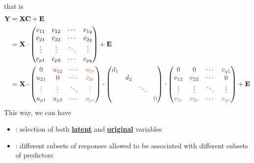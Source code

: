 \documentclass[twoside]{article}
\begin{document}
that is 
\begin{align*}
    \mathbf{Y} &= \mathbf{X}\mathbf{C} +\mathbf{E}\\
    &= \mathbf{X}\cdot \begin{pmatrix}
        c_{11} & c_{12} & \cdots & c_{1q} \\
        c_{21} & c_{22} & \cdots & c_{2q} \\
        \vdots & \vdots & \ddots & \vdots \\
        c_{p1} & c_{p2} & \cdots & c_{pq} 
    \end{pmatrix} + \mathbf{E} \\
    &= \mathbf{X}\cdot \begin{pmatrix}
        \textcolor{myblue}{0} & \textcolor{myred}{u_{12}} & \cdots & \textcolor{myorange}{u_{1r}} \\
        \textcolor{myblue}{u_{21}} & \textcolor{myred}{0} & \cdots & \textcolor{myorange}{c_{2r}} \\
        \textcolor{myblue}{\vdots} & \textcolor{myred}{\vdots} & \ddots & \textcolor{myorange}{\vdots} \\
        \textcolor{myblue}{u_{p1}} & \textcolor{myred}{u_{p2}} & \cdots & \textcolor{myorange}{u_{pr}} 
    \end{pmatrix}\cdot \begin{pmatrix}
        \textcolor{myblue}{d_1} & & & \\
         & \textcolor{myred}{d_2} & & \\
         & & \ddots & \\
         & & & \textcolor{myorange}{0}
    \end{pmatrix} \cdot \begin{pmatrix}
        \textcolor{myblue}{0} & \textcolor{myblue}{0} & \cdots & \textcolor{myblue}{v_{q1}} \\
        \textcolor{myred}{v_{12}} & \textcolor{myred}{v_{22}} & \cdots & \textcolor{myred}{0} \\
        \vdots & \vdots & \ddots & \vdots \\
        \textcolor{myorange}{v_{1r}} & \textcolor{myorange}{v_{2r}} & \cdots & \textcolor{myorange}{v_{qr}} 
    \end{pmatrix}
      + \mathbf{E}
\end{align*}
This way, we can have 
\begin{itemize}
    \item {}: selection of both \textbf{\underline{latent}} and \textbf{\underline{original}} variables
    \item {}: different subsets of responses allowed to be associated with different subsets of predictors
\end{itemize}
\end{document}
